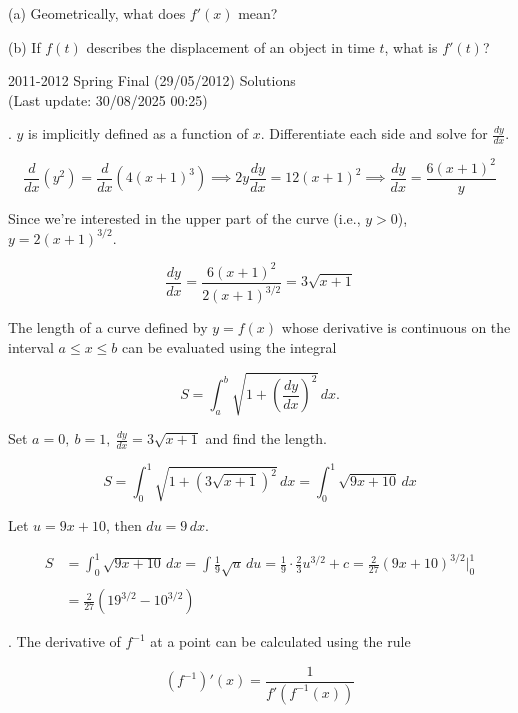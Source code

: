 \documentclass{article}
\begin{document}
\noindent (a) Geometrically, what does $f'(x)$ mean?

\hfill

\noindent (b) If $f(t)$ describes the displacement of an object in time $t$, what is $f'(t)$?

\newpage

\begin{center}
2011-2012 Spring Final (29/05/2012) Solutions\\
(Last update: 30/08/2025 00:25)
\end{center}

. $y$ is implicitly defined as a function of $x$. Differentiate each side and solve for $\displaystyle \frac{dy}{dx}$.

\[\frac d{dx}\left(y^2\right)=\frac d{dx}\left(4(x+1)^3\right)\implies 2y\frac{dy}{dx}=12(x+1)^2\implies\frac{dy}{dx}=\frac{6(x+1)^2}y\]

\hfill

\noindent Since we're interested in the upper part of the curve (i.e., $y>0$), $y=2(x+1)^{3/2}$.

\[\frac{dy}{dx}=\frac{6(x+1)^2}{2(x+1)^{3/2}}=3\sqrt{x+1}\]

\hfill

\noindent The length of a curve defined by $y=f(x)$ whose derivative is continuous on the interval $a\leq x\leq b$ can be evaluated using the integral

\[S=\int_a^b\sqrt{1+\left(\frac{dy}{dx}\right)^2}\,dx.\]

\hfill

\noindent Set $\displaystyle a=0,\:b=1,\:\frac{dy}{dx}=3\sqrt{x+1}$ and find the length.

\[S=\int_0^1\sqrt{1+\left(3\sqrt{x+1}\right)^2}\,dx=\int_0^1\sqrt{9x+10}\,dx\]

\hfill

\noindent Let $u=9x+10$, then $du=9\,dx$.

\begin{align*}
S&=\int_0^1\sqrt{9x+10}\,dx=\int\frac19\sqrt{u}\,du=\frac19\cdot\frac23u^{3/2}+c=\frac2{27}\left(9x+10\right)^{3/2}\bigg|_0^1\\\\&=\boxed{\frac2{27}\left(19^{3/2}-10^{3/2}\right)}
\end{align*}

\hfill

. The derivative of $f^{-1}$ at a point can be calculated using the rule

\[\left(f^{-1}\right)'(x)=\frac1{f'\left(f^{-1}(x)\right)}\]
\end{document}
